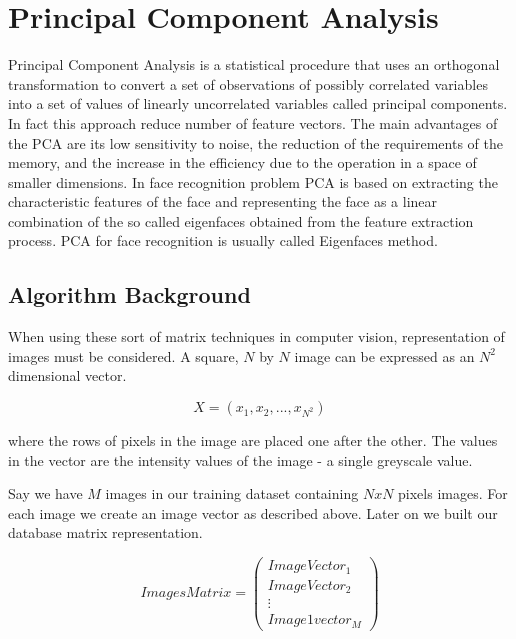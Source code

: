 
\chapter{Principal Component Analysis}
\label{cha:PCA}

Principal Component Analysis is a statistical procedure that uses an orthogonal transformation to convert a set of observations of possibly correlated variables into a set of values of linearly uncorrelated variables called principal components. In fact this approach reduce number of feature vectors. The main advantages of the PCA are its low sensitivity to noise, the reduction of the requirements of the memory, and the increase in the efficiency due to the operation in a space of smaller dimensions. In face recognition problem PCA is based on extracting the characteristic features of the face and representing the face as a linear combination of the so called eigenfaces obtained from the feature extraction process. PCA for face recognition is usually called Eigenfaces method.


\section{Algorithm Background}

When using these sort of matrix techniques in computer vision, representation of images must be considered. A square, $N$ by  $N$ image can be expressed as an $N^{2}$ dimensional vector. 

\begin{equation}
X = ( x_{1}, x_{2}, ... , x_{N^{2}})
\end{equation}

where the rows of pixels in the image are placed one after the other. The values in the vector are the intensity values of the image - a single greyscale value. 

Say we have $M$ images in our training dataset containing $NxN$ pixels images. For each image we create an image vector as described above. Later on we built our database matrix representation.


\begin{equation}
ImagesMatrix = 
 \begin{pmatrix}
 ImageVector_{1} \\
 ImageVector_{2} \\
  \vdots  \\
 Image1vector_{M} 
 \end{pmatrix}
 \end{equation}
 
